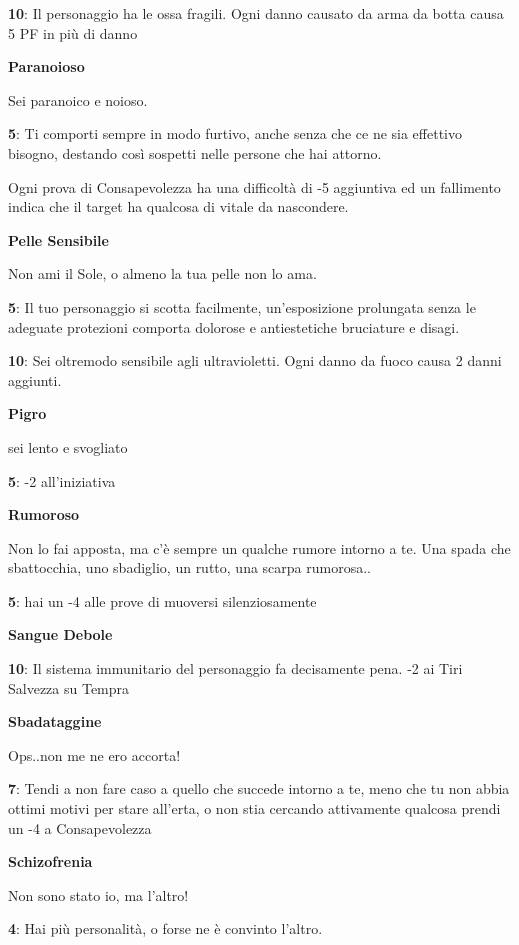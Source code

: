 \documentclass[a4paper,11pt,twoside,openany]{book}
\begin{document}
\textbf{10}: Il personaggio ha le ossa fragili. Ogni danno causato da arma da botta causa 5 PF in più di danno

\textbf{Paranoioso}

Sei paranoico e noioso.

\textbf{5}: Ti comporti sempre in modo furtivo, anche senza che ce ne sia effettivo bisogno, destando così sospetti nelle persone che hai attorno.

Ogni prova di Consapevolezza ha una difficoltà di -5 aggiuntiva ed un fallimento indica che il target ha qualcosa di vitale da nascondere.

\textbf{Pelle Sensibile}

Non ami il Sole, o almeno la tua pelle non lo ama.

\textbf{5}: Il tuo personaggio si scotta facilmente, un'esposizione prolungata senza le adeguate protezioni comporta dolorose e antiestetiche bruciature e disagi.

\textbf{10}: Sei oltremodo sensibile agli ultravioletti. Ogni danno da fuoco causa 2 danni aggiunti.

\textbf{Pigro}

sei lento e svogliato

\textbf{5}: -2 all'iniziativa

\textbf{Rumoroso}

Non lo fai apposta, ma c'è sempre un qualche rumore intorno a te. Una spada che sbattocchia, uno sbadiglio, un rutto, una scarpa rumorosa..

\textbf{5}: hai un -4 alle prove di muoversi silenziosamente

\textbf{Sangue Debole}

\textbf{10}: Il sistema immunitario del personaggio fa decisamente pena. -2 ai Tiri Salvezza su Tempra

\textbf{Sbadataggine}

Ops..non me ne ero accorta!

\textbf{7}: Tendi a non fare caso a quello che succede intorno a te, meno che tu non abbia ottimi motivi per stare all'erta, o non stia cercando attivamente qualcosa prendi un -4 a Consapevolezza

\textbf{Schizofrenia}

Non sono stato io, ma l'altro!

\textbf{4}: Hai più personalità, o forse ne è convinto l'altro.
\end{document}
